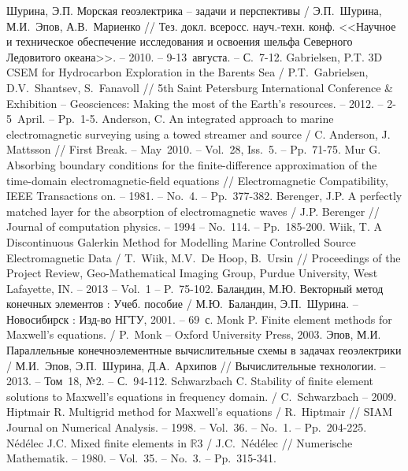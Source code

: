 \documentclass[a4paper,12pt]{article}
\begin{document}
\begin{thebibliography}{10}
Шурина, Э.П. Морская геоэлектрика -- задачи и перспективы / Э.П.~Шурина, М.И.~Эпов, А.В.~Мариенко // Тез. докл. всеросс. науч.-техн. конф. <<Научное и техническое обеспечение исследования и освоения шельфа Северного Ледовитого океана>>. -- 2010. -- 9-13~августа. -- С.~7-12.
Gabrielsen, P.T. 3D CSEM for Hydrocarbon Exploration in the Barents Sea / P.T.~Gabrielsen, D.V.~Shantsev, S.~Fanavoll // 5th Saint Petersburg International Conference \& Exhibition -- Geosciences: Making the most of the Earth’s resources. -- 2012. -- 2-5~April. -- Pp.~1-5.
Anderson, C. An integrated approach to marine electromagnetic surveying using a towed streamer and source / C. Anderson, J. Mattsson // First Break. -- May~2010. -- Vol.~28, Iss.~5. -- Pp.~71-75.
Mur G. Absorbing boundary conditions for the finite-difference approximation of the time-domain electromagnetic-field equations // Electromagnetic Compatibility, IEEE Transactions on. -- 1981. -- No.~4. -- Pp.~377-382.
Berenger, J.P. A perfectly matched layer for the absorption of electromagnetic waves / J.P. Berenger // Journal of computation physics. -- 1994 -- No.~114. -- Pp.~185-200.
Wiik, T. A Discontinuous Galerkin Method for Modelling Marine Controlled Source Electromagnetic Data / T.~Wiik, M.V.~De Hoop, B.~Ursin // Proceedings of the Project Review, Geo-Mathematical Imaging Group, Purdue University, West Lafayette, IN. -- 2013 -- Vol.~1 -- P.~75-102.
Баландин, М.Ю. Векторный метод конечных элементов : Учеб. пособие / М.Ю.~Баландин, Э.П.~Шурина. -- Новосибирск : Изд-во НГТУ, 2001. -- 69~с.
Monk P. Finite element methods for Maxwell's equations. / P.~Monk -- Oxford University Press, 2003.
Эпов, М.И. Параллельные конечноэлементные вычислительные схемы в задачах геоэлектрики / М.И.~Эпов, Э.П.~Шурина, Д.А.~Архипов // Вычислительные технологии. -- 2013. -- Том~18, №2. -- С.~94-112.
Schwarzbach C. Stability of finite element solutions to Maxwell's equations in frequency domain. / C.~Schwarzbach -- 2009.
Hiptmair R. Multigrid method for Maxwell's equations / R.~Hiptmair // SIAM Journal on Numerical Analysis. -- 1998. -- Vol.~36. -- No.~1. -- Pp.~204-225.
Nédélec J.C. Mixed finite elements in $\mathbb{R}$3 / J.C.~Nédélec // Numerische Mathematik. -- 1980. -- Vol.~35. -- No.~3. -- Pp.~315-341.

\end{thebibliography}
\end{document}
